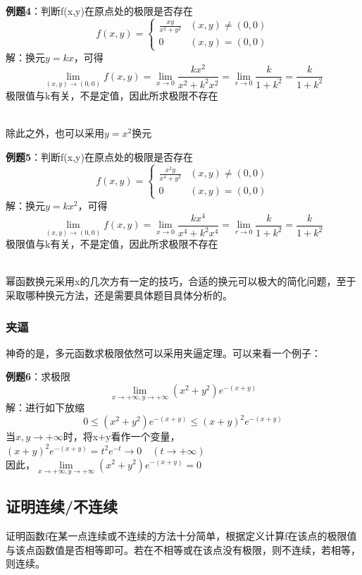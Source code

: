 \documentclass{article}
\begin{document}
\textbf{例题4}：判断f(x,y)在原点处的极限是否存在
\[f(x,y)= \begin{cases} \frac{xy}{ x^2+y^2 }  & (x,y) \neq (0,0)\\0 & (x,y) = (0,0)\end{cases}\]
\quad \quad 解：换元$y=kx$，可得
\[\lim\limits_{(x,y) \rightarrow (0,0)}f(x,y)=  
\lim\limits_{x \rightarrow 0}  \frac{kx^2}{x^2+k^2x^2}= 
\lim\limits_{r \rightarrow 0}  \frac{k}{1+k^2}  = \frac{k}{1+k^2}\]
极限值与k有关，不是定值，因此所求极限不存在

~\\

除此之外，也可以采用$y=x^2$换元

\textbf{例题5}：判断f(x,y)在原点处的极限是否存在
\[f(x,y)= \begin{cases} \frac{x^2y}{ x^4+y^2 }  & (x,y) \neq (0,0)\\0 & (x,y) = (0,0)\end{cases}\]
\quad \quad 解：换元$y=kx^2$，可得
\[\lim\limits_{(x,y) \rightarrow (0,0)}f(x,y)=  
\lim\limits_{x \rightarrow 0}  \frac{kx^4}{x^4+k^2x^4}= 
\lim\limits_{r \rightarrow 0}  \frac{k}{1+k^2}  = \frac{k}{1+k^2}\]
极限值与k有关，不是定值，因此所求极限不存在

~\\

幂函数换元采用x的几次方有一定的技巧，合适的换元可以极大的简化问题，至于采取哪种换元方法，还是需要具体题目具体分析的。

\newpage

\subsubsection{夹逼}
神奇的是，多元函数求极限依然可以采用夹逼定理。可以来看一个例子：

\textbf{例题6}：求极限
\[\lim\limits_{x \rightarrow +\infty,y \rightarrow+\infty}(x^2+y^2)e^{-(x+y)} \]
\quad \quad 解：进行如下放缩
\[0 \leq (x^2+y^2)e^{-(x+y)}  \leq(x+y)^2e^{-(x+y)}\]
当$x,y \rightarrow +\infty$时，将x+y看作一个变量，$(x+y)^2e^{-(x+y)} = t^2e^{-t} \rightarrow 0 \quad (t \rightarrow +\infty)$  \\
因此，$\lim\limits_{x \rightarrow +\infty,y \rightarrow+\infty}(x^2+y^2)e^{-(x+y)} = 0$


\subsection{证明连续/不连续}
证明函数f在某一点连续或不连续的方法十分简单，根据定义计算f在该点的极限值与该点函数值是否相等即可。若在不相等或在该点没有极限，则不连续，若相等，则连续。
\end{document}
